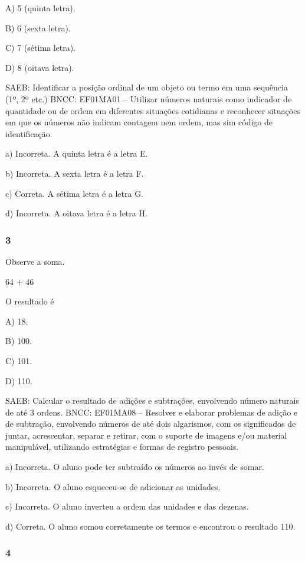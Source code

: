 A) 5 (quinta letra).

B) 6 (sexta letra).

C) 7 (sétima letra).

D) 8 (oitava letra).

SAEB: Identificar a posição ordinal de um objeto ou termo em uma
sequência (1º, 2º etc.)
BNCC: EF01MA01 -- Utilizar números naturais como indicador de quantidade
ou de ordem em diferentes situações cotidianas e reconhecer situações em
que os números não indicam contagem nem ordem, mas sim código de
identificação.

a) Incorreta. A quinta letra é a letra E.

b) Incorreta. A sexta letra é a letra F.

c) Correta. A sétima letra é a letra G.

d) Incorreta. A oitava letra é a letra H.

\subsubsection{3}\label{section-89}

Observe a soma.

64 + 46

O resultado é

A) 18.

B) 100.

C) 101.

D) 110.

SAEB: Calcular o resultado de adições e subtrações, envolvendo
número naturais de até 3 ordens.
BNCC: EF01MA08 -- Resolver e elaborar problemas de adição e de subtração,
envolvendo números de até dois algarismos, com os significados de
juntar, acrescentar, separar e retirar, com o suporte de imagens e/ou
material manipulável, utilizando estratégias e formas de registro
pessoais.

a) Incorreta. O aluno pode ter subtraído os números ao invés de
somar.

b) Incorreta. O aluno esqueceu-se de adicionar as unidades.

c) Incorreta. O aluno inverteu a ordem das unidades e das dezenas.

d) Correta. O aluno somou corretamente os termos e encontrou o resultado 110.

\subsubsection{4}\label{section-90}

